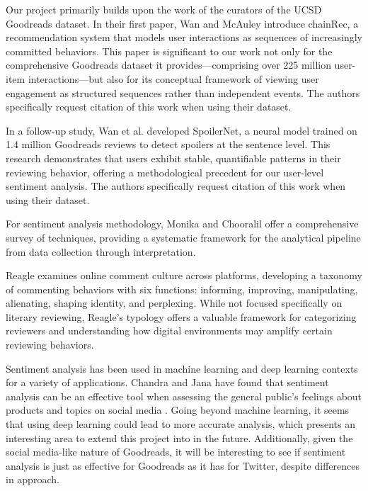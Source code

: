 Our project primarily builds upon the work of the curators of the UCSD Goodreads dataset. In their first paper, Wan and McAuley \cite{wan2018} introduce chainRec, a recommendation system that models user interactions as sequences of increasingly committed behaviors. This paper is significant to our work not only for the comprehensive Goodreads dataset it provides—comprising over 225 million user-item interactions—but also for its conceptual framework of viewing user engagement as structured sequences rather than independent events. The authors specifically request citation of this work when using their dataset.

In a follow-up study, Wan et al. \cite{wan2019} developed SpoilerNet, a neural model trained on 1.4 million Goodreads reviews to detect spoilers at the sentence level. This research demonstrates that users exhibit stable, quantifiable patterns in their reviewing behavior, offering a methodological precedent for our user-level sentiment analysis. The authors specifically request citation of this work when using their dataset.

For sentiment analysis methodology, Monika and Chooralil \cite{monika2023} offer a comprehensive survey of techniques, providing a systematic framework for the analytical pipeline from data collection through interpretation.

Reagle \cite{reagle2015} examines online comment culture across platforms, developing a taxonomy of commenting behaviors with six functions: informing, improving, manipulating, alienating, shaping identity, and perplexing. While not focused specifically on literary reviewing, Reagle's typology offers a valuable framework for categorizing reviewers and understanding how digital environments may amplify certain reviewing behaviors.

Sentiment analysis has been used in machine learning and deep learning contexts for a variety of applications.
Chandra and Jana have found that sentiment analysis can be an effective tool when assessing the general public's
feelings about products and topics on social media \cite{chandra2020}. Going beyond machine learning, it seems
that using deep learning could lead to more accurate analysis, which presents an interesting area to extend
this project into in the future. Additionally, given the social media-like nature of Goodreads, it will be
interesting to see if sentiment analysis is just as effective for Goodreads as it has for Twitter, despite
differences in approach.

